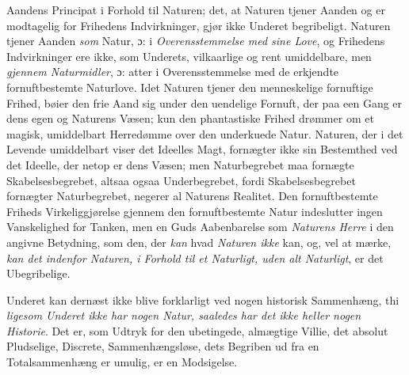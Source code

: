 \documentclass[12pt,a4paper]{book}
\begin{document}
Aandens Principat i Forhold til Naturen; det, at Naturen tjener Aanden og er
modtagelig for Frihedens Indvirkninger, gjør ikke Underet begribeligt. Naturen tjener
Aanden \emph{som} Natur, ɔ: i \emph{Overensstemmelse med sine Love}, og Frihedens Indvirkninger
ere ikke, som Underets, vilkaarlige og rent umiddelbare, men \emph{gjennem Naturmidler}, ɔ:
atter i Overensstemmelse med de erkjendte fornuftbestemte Naturlove. Idet Naturen tjener
den menneskelige fornuftige Frihed, bøier den frie Aand sig under den uendelige Fornuft,
der paa een Gang er dens egen og Naturens Væsen; kun den phantastiske Frihed drømmer om
et magisk, umiddelbart Herredømme over den underkuede Natur. Naturen, der i det Levende
umiddelbart viser det Ideelles Magt, fornægter ikke sin Bestemthed ved det Ideelle, der
netop er dens Væsen; men Naturbegrebet maa fornægte Skabelsesbegrebet, altsaa ogsaa
Underbegrebet, fordi Skabelsesbegrebet fornægter Naturbegrebet, negerer al Naturens
Realitet. Den fornuftbestemte Friheds Virkeliggjørelse gjennem den fornuftbestemte Natur
indeslutter ingen Vanskelighed for Tanken, men en Guds Aabenbarelse som \emph{Naturens Herre} i den angivne Betydning, som den, der \emph{kan} hvad \emph{Naturen ikke} kan, og, vel at mærke,
\emph{kan det indenfor Naturen, i Forhold til et Naturligt, uden alt Naturligt}, er det
Ubegribelige.

Underet kan dernæst ikke blive forklarligt ved nogen historisk Sammenhæng, thi
\emph{ligesom Underet ikke har nogen Natur, saaledes har det ikke heller nogen Historie}.
Det er, som Udtryk for den ubetingede, almægtige Villie, det absolut Pludselige, Discrete,
Sammenhængsløse, dets Begriben ud fra en Totalsammenhæng er umulig, er en Modsigelse.
\end{document}
